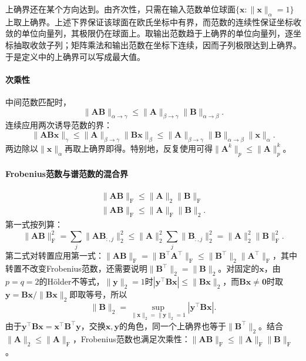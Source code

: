上确界还在某个方向达到。由齐次性，只需在输入范数单位球面$\{\bm x:\lVert\bm x\rVert_\alpha=1\}$上取上确界。上述下界保证该球面在欧氏坐标中有界，而范数的连续性保证坐标收敛的单位向量列，其极限仍在球面上。取输出范数趋于上确界的单位向量列，逐坐标抽取收敛子列；矩阵乘法和输出范数在坐标下连续，因而子列极限达到上确界。于是定义中的上确界可以写成最大值。

\paragraph{次乘性}
中间范数匹配时，
\[
 \lVert\bm A\bm B\rVert_{\alpha\to\gamma}
 \leq\lVert\bm A\rVert_{\beta\to\gamma}
 \lVert\bm B\rVert_{\alpha\to\beta}.
\]
连续应用两次诱导范数的界：
\[
 \lVert\bm A\bm B\bm x\rVert_\gamma\leq\lVert\bm A\rVert_{\beta\to\gamma}\lVert\bm B\bm x\rVert_\beta\leq\lVert\bm A\rVert_{\beta\to\gamma}\lVert\bm B\rVert_{\alpha\to\beta}\lVert\bm x\rVert_\alpha.
\]
两边除以$\lVert\bm x\rVert_\alpha$再取上确界即得。特别地，反复使用可得$\lVert\bm A^k\rVert_p\leq\lVert\bm A\rVert_p^k$。

\paragraph{Frobenius范数与谱范数的混合界}
\begin{equation}
\begin{gathered}
\lVert\bm A\bm B\rVert_{\mathrm F}
 \leq\lVert\bm A\rVert_2\lVert\bm B\rVert_{\mathrm F}\\
\lVert\bm A\bm B\rVert_{\mathrm F}
 \leq\lVert\bm A\rVert_{\mathrm F}\lVert\bm B\rVert_2.
\end{gathered}
\label{eq:matrix-analysis-mixed-submultiplicativity}
\end{equation}
第一式按列算：
\[
 \lVert\bm A\bm B\rVert_{\mathrm F}^2=\sum_j\lVert\bm A\bm B_{:,j}\rVert_2^2\leq\lVert\bm A\rVert_2^2\sum_j\lVert\bm B_{:,j}\rVert_2^2=\lVert\bm A\rVert_2^2\lVert\bm B\rVert_{\mathrm F}^2.
\]
第二式对转置应用第一式：$\lVert\bm A\bm B\rVert_{\mathrm F}=\lVert\bm B^\top\bm A^\top\rVert_{\mathrm F}\leq\lVert\bm B^\top\rVert_2\lVert\bm A^\top\rVert_{\mathrm F}$，其中转置不改变Frobenius范数，还需要说明$\lVert\bm B^\top\rVert_2=\lVert\bm B\rVert_2$。对固定的$\bm x$，由$p=q=2$的Hölder不等式，$\lVert\bm y\rVert_2=1$时$|\bm y^\top\bm B\bm x|\leq\lVert\bm B\bm x\rVert_2$，而$\bm B\bm x\neq\bm0$时取$\bm y=\bm B\bm x/\lVert\bm B\bm x\rVert_2$即取等号，所以
\[
 \lVert\bm B\rVert_2=\sup_{\lVert\bm x\rVert_2=\lVert\bm y\rVert_2=1}|\bm y^\top\bm B\bm x|.
\]
由于$\bm y^\top\bm B\bm x=\bm x^\top\bm B^\top\bm y$，交换$\bm x,\bm y$的角色，同一个上确界也等于$\lVert\bm B^\top\rVert_2$。结合$\lVert\bm A\rVert_2\leq\lVert\bm A\rVert_{\mathrm F}$，Frobenius范数也满足次乘性：$\lVert\bm A\bm B\rVert_{\mathrm F}\leq\lVert\bm A\rVert_{\mathrm F}\lVert\bm B\rVert_{\mathrm F}$。

